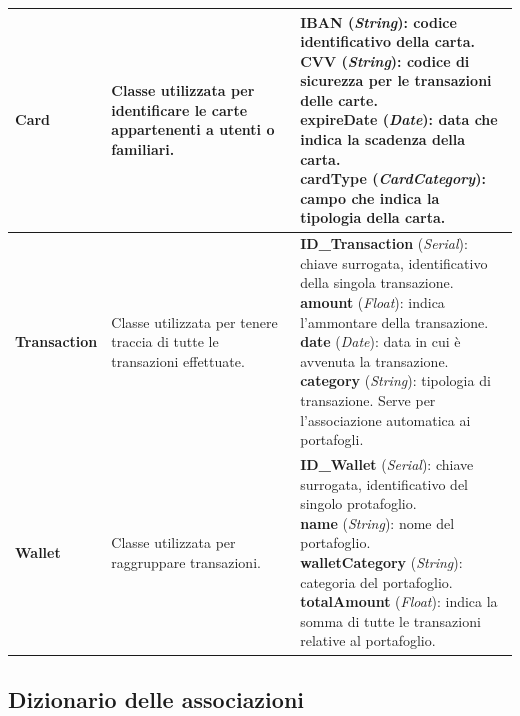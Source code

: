 \begin{longtable}{m{2.7cm}|m{4cm}|m{7cm}}
    \textbf{Card} & \raggedright Classe utilizzata per identificare le carte appartenenti a utenti o familiari. &
    \parbox{7cm}{
        \textbf{IBAN} (\textit{String}): codice identificativo della carta. \\
        \textbf{CVV} (\textit{String}): codice di sicurezza per le transazioni delle carte. \\
        \textbf{expireDate} (\textit{Date}): data che indica la scadenza della carta. \\
        \textbf{cardType} (\textit{CardCategory}): campo che indica la tipologia della carta.
    } \\ \hline

    \textbf{Transaction} & \raggedright Classe utilizzata per tenere traccia di tutte le transazioni effettuate. &
    \parbox{7cm}{
        \textbf{ID\_Transaction} (\textit{Serial}): chiave surrogata, identificativo della singola transazione. \\
        \textbf{amount} (\textit{Float}): indica l'ammontare della transazione. \\
        \textbf{date} (\textit{Date}): data in cui è avvenuta la transazione. \\
        \textbf{category} (\textit{String}): tipologia di transazione. Serve per l'associazione automatica ai portafogli.
    } \\ \hline

    \textbf{Wallet} & \raggedright Classe utilizzata per raggruppare transazioni. &
    \parbox{7cm}{
        \textbf{ID\_Wallet} (\textit{Serial}): chiave surrogata, identificativo del singolo protafoglio. \\
        \textbf{name} (\textit{String}): nome del portafoglio. \\
        \textbf{walletCategory} (\textit{String}): categoria del portafoglio. \\
        \textbf{totalAmount} (\textit{Float}): indica la somma di tutte le transazioni relative al portafoglio.
    } \\ \hline

\end{longtable}

\subsection{Dizionario delle associazioni}

